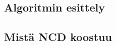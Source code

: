 \documentclass[finnish]{tktltiki2}
\theoremstyle{definition}
\theoremstyle{remark}
\begin{document}
\subsection{Algoritmin esittely} %
\label{sub:algoritmin_esittely}


\subsection{Mistä NCD koostuu} %
\label{sub:mist_ncd_koostuu}


%
%

%

% 





%
\end{document}
